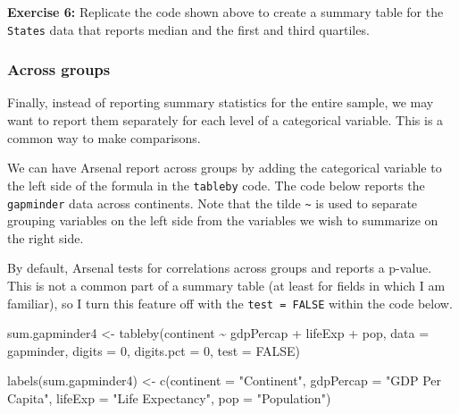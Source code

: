 \documentclass[
]{book}
\makeatletter
\newenvironment{Shaded}{\begin{snugshade}}{\end{snugshade}}
\newcommand{\AttributeTok}[1]{\textcolor[rgb]{0.61,0.61,0.61}{#1}}
\newcommand{\ConstantTok}[1]{\textcolor[rgb]{0,0,0}{#1}}
\newcommand{\DecValTok}[1]{\textcolor[rgb]{0.06,0.06,0.06}{#1}}
\newcommand{\FunctionTok}[1]{\textcolor[rgb]{0,0,0}{#1}}
\newcommand{\NormalTok}[1]{#1}
\newcommand{\OtherTok}[1]{\textcolor[rgb]{0.37,0.37,0.37}{#1}}
\newcommand{\SpecialCharTok}[1]{\textcolor[rgb]{0,0,0}{#1}}
\newcommand{\StringTok}[1]{\textcolor[rgb]{0.5,0.5,0.5}{#1}}
\newenvironment{kframe}{%
\medskip{}
\setlength{\fboxsep}{.8em}
 \def\at@end@of@kframe{}%
 \ifinner\ifhmode%
  \def\at@end@of@kframe{\end{minipage}}%
  \begin{minipage}{\columnwidth}%
 \fi\fi%
 \def\FrameCommand##1{\hskip\@totalleftmargin \hskip-\fboxsep
 \colorbox{shadecolor}{##1}\hskip-\fboxsep
     \hskip-\linewidth \hskip-\@totalleftmargin \hskip\columnwidth}%
 \MakeFramed {\advance\hsize-\width
   \@totalleftmargin\z@ \linewidth\hsize
   \@setminipage}}%
 {\par\unskip\endMakeFramed%
 \at@end@of@kframe}
\renewenvironment{Shaded}{\begin{kframe}}{\end{kframe}}
\newenvironment{rmdblock}[1]
  {\begin{shaded*}
  }
  {\end{shaded*}
  }
\newenvironment{learncheck}
  {\begin{rmdblock}{warning}}
  {\end{rmdblock}}
\makeatother
\begin{document}
\begin{learncheck}
\textbf{Exercise 6:} Replicate the code shown above to create a summary
table for the \texttt{States} data that reports median and the first and
third quartiles.
\end{learncheck}

\hypertarget{across-groups}{%
\subsubsection{Across groups}\label{across-groups}}

Finally, instead of reporting summary statistics for the entire sample, we may want to report them separately for each level of a categorical variable. This is a common way to make comparisons.

We can have Arsenal report across groups by adding the categorical variable to the left side of the formula in the \texttt{tableby} code. The code below reports the \texttt{gapminder} data across continents. Note that the tilde \texttt{\textasciitilde{}} is used to separate grouping variables on the left side from the variables we wish to summarize on the right side.

By default, Arsenal tests for correlations across groups and reports a p-value. This is not a common part of a summary table (at least for fields in which I am familiar), so I turn this feature off with the \texttt{test\ =\ FALSE} within the code below.

\begin{Shaded}
\begin{Highlighting}[]
\NormalTok{sum.gapminder4 }\OtherTok{\textless{}{-}} \FunctionTok{tableby}\NormalTok{(continent }\SpecialCharTok{\textasciitilde{}}\NormalTok{ gdpPercap }\SpecialCharTok{+}\NormalTok{ lifeExp }\SpecialCharTok{+}\NormalTok{ pop, }\AttributeTok{data =}\NormalTok{ gapminder, }\AttributeTok{digits =} \DecValTok{0}\NormalTok{, }\AttributeTok{digits.pct =} \DecValTok{0}\NormalTok{, }\AttributeTok{test =} \ConstantTok{FALSE}\NormalTok{)}

\FunctionTok{labels}\NormalTok{(sum.gapminder4) }\OtherTok{\textless{}{-}} \FunctionTok{c}\NormalTok{(}\AttributeTok{continent =} \StringTok{"Continent"}\NormalTok{, }\AttributeTok{gdpPercap =} \StringTok{"GDP Per Capita"}\NormalTok{, }\AttributeTok{lifeExp =} \StringTok{"Life Expectancy"}\NormalTok{, }\AttributeTok{pop =} \StringTok{"Population"}\NormalTok{)}
\end{Highlighting}
\end{Shaded}
\end{document}
